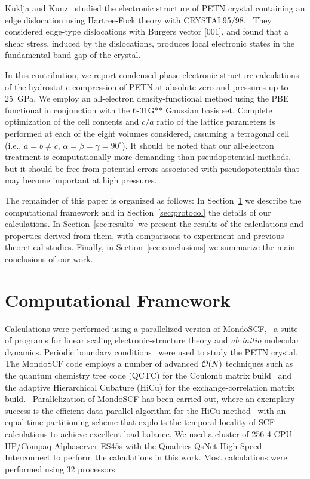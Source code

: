 \documentclass[prb,aps,nobibnotes,twocolumn,doublespace,twocolumngrid,superbib]{revtex4}
\begin{document}
Kuklja and Kunz~\cite{Kuklja_2001v89} studied the electronic structure 
of PETN crystal containing an edge dislocation using Hartree-Fock
theory with CRYSTAL95/98.~\cite{Crystal95} They considered
edge-type dislocations with Burgers vector [001], and 
found that a shear stress, induced by the dislocations, produces local 
electronic states in the fundamental band gap of the crystal.

In this contribution, we report condensed phase electronic-structure
calculations of the hydrostatic compression of PETN at absolute zero
and pressures up to 25~GPa.  We employ an all-electron
density-functional method using the PBE~\cite{Perdew_96v77} functional
in conjunction with the 6-31G** Gaussian basis set.  Complete
optimization of the cell contents and $c/a$ ratio of the lattice
parameters is performed at each of the eight volumes considered,
assuming a tetragonal cell (i.e., $a=b \neq c$,
$\alpha=\beta=\gamma=90^\circ$).  It should be noted that our
all-electron treatment is computationally more demanding than
pseudopotential methods, but it should be free from potential errors
associated with pseudopotentials that may become important at high
pressures.

The remainder of this paper is organized as follows: In
Section~\ref{sec:comput} we describe the computational framework and
in Section~\ref{sec:protocol} the details of our calculations. In
Section~\ref{sec:results} we present the results of the calculations
and properties derived from them, with comparisons to experiment and
previous theoretical studies.  Finally, in
Section~\ref{sec:conclusions} we summarize the main conclusions of our
work.

\section{Computational Framework}
\label{sec:comput}
Calculations were performed using a parallelized version of
MondoSCF,~\cite{MondoSCF} a suite of programs for linear scaling
electronic-structure theory and {\it ab initio} molecular dynamics.
Periodic boundary conditions~\cite{CTymczak03} were used to study the
PETN crystal.  The MondoSCF code employs a number of advanced ${\cal O}(N)$
techniques such as the quantum chemistry tree code (QCTC) for the
Coulomb matrix
build~\cite{MChallacombe96,MChallacombe96B,MChallacombe97} and the
adaptive Hierarchical Cubature (HiCu) for the exchange-correlation
matrix build.~\cite{MChallacombe00A} Parallelization of MondoSCF has
been carried out, where an exemplary success is the efficient
data-parallel algorithm for the HiCu method~\cite{CGan03} with an
equal-time partitioning scheme that exploits the temporal locality of
SCF calculations to achieve excellent load balance.  
We used a cluster of 256 4-CPU HP/Compaq Alphaserver ES45s with the Quadrics 
QsNet High Speed Interconnect to perform the calculations in this work.  
Most calculations were performed using 32 processors.
\end{document}
